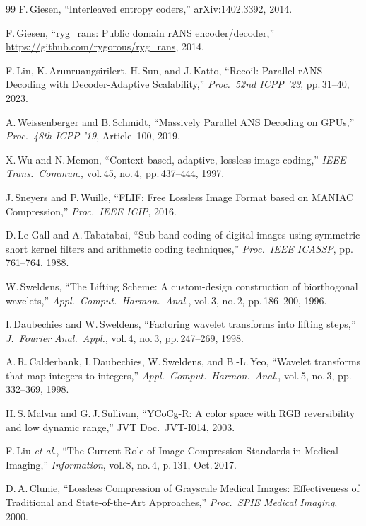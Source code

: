 \documentclass[10pt,twocolumn]{article}
\begin{document}
\begin{thebibliography}{99}
F.\,Giesen, ``Interleaved entropy coders,'' arXiv:1402.3392, 2014.

F.\,Giesen, ``ryg\_rans: Public domain rANS encoder/decoder,''
\url{https://github.com/rygorous/ryg_rans}, 2014.

F.\,Lin, K.\,Arunruangsirilert, H.\,Sun, and J.\,Katto,
``Recoil: Parallel rANS Decoding with Decoder-Adaptive Scalability,''
\textit{Proc.\ 52nd ICPP '23}, pp.\,31--40, 2023.

A.\,Weissenberger and B.\,Schmidt,
``Massively Parallel ANS Decoding on GPUs,''
\textit{Proc.\ 48th ICPP '19}, Article~100, 2019.

X.\,Wu and N.\,Memon,
``Context-based, adaptive, lossless image coding,''
\textit{IEEE Trans.\ Commun.}, vol.\,45, no.\,4, pp.\,437--444, 1997.

J.\,Sneyers and P.\,Wuille,
``FLIF: Free Lossless Image Format based on MANIAC Compression,''
\textit{Proc.\ IEEE ICIP}, 2016.

D.\,Le Gall and A.\,Tabatabai,
``Sub-band coding of digital images using symmetric short kernel filters and
arithmetic coding techniques,'' \textit{Proc.\ IEEE ICASSP}, pp.\,761--764, 1988.

W.\,Sweldens,
``The Lifting Scheme: A custom-design construction of biorthogonal wavelets,''
\textit{Appl.\ Comput.\ Harmon.\ Anal.}, vol.\,3, no.\,2, pp.\,186--200, 1996.

I.\,Daubechies and W.\,Sweldens,
``Factoring wavelet transforms into lifting steps,''
\textit{J.\ Fourier Anal.\ Appl.}, vol.\,4, no.\,3, pp.\,247--269, 1998.

A.\,R.\,Calderbank, I.\,Daubechies, W.\,Sweldens, and B.-L.\,Yeo,
``Wavelet transforms that map integers to integers,''
\textit{Appl.\ Comput.\ Harmon.\ Anal.}, vol.\,5, no.\,3, pp.\,332--369, 1998.

H.\,S.\,Malvar and G.\,J.\,Sullivan,
``YCoCg-R: A color space with RGB reversibility and low dynamic range,''
JVT Doc.\ JVT-I014, 2003.

F.\,Liu \textit{et al.},
``The Current Role of Image Compression Standards in Medical Imaging,''
\textit{Information}, vol.\,8, no.\,4, p.\,131, Oct.\,2017.

D.\,A.\,Clunie,
``Lossless Compression of Grayscale Medical Images: Effectiveness of
Traditional and State-of-the-Art Approaches,''
\textit{Proc.\ SPIE Medical Imaging}, 2000.


\end{thebibliography}
\end{document}
